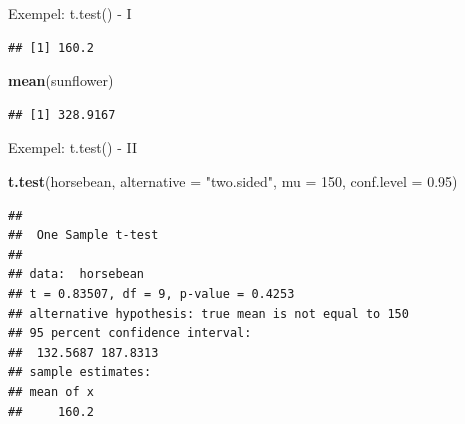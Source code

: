 \documentclass[
  11pt,
  ignorenonframetext,
  handout]{beamer}
\newenvironment{Shaded}{\begin{snugshade}}{\end{snugshade}}
\newcommand{\AttributeTok}[1]{\textcolor[rgb]{0.13,0.29,0.53}{#1}}
\newcommand{\DecValTok}[1]{\textcolor[rgb]{0.00,0.00,0.81}{#1}}
\newcommand{\FloatTok}[1]{\textcolor[rgb]{0.00,0.00,0.81}{#1}}
\newcommand{\FunctionTok}[1]{\textcolor[rgb]{0.13,0.29,0.53}{\textbf{#1}}}
\newcommand{\NormalTok}[1]{#1}
\newcommand{\OtherTok}[1]{\textcolor[rgb]{0.56,0.35,0.01}{#1}}
\newcommand{\SpecialCharTok}[1]{\textcolor[rgb]{0.81,0.36,0.00}{\textbf{#1}}}
\newcommand{\StringTok}[1]{\textcolor[rgb]{0.31,0.60,0.02}{#1}}
\begin{document}
\begin{frame}[fragile]{Exempel: t.test() - I}
\protect{}\label{exempel-t.test---i}
\begin{Shaded}
\end{Shaded}

\begin{verbatim}
## [1] 160.2
\end{verbatim}

\begin{Shaded}
\begin{Highlighting}[]
\FunctionTok{mean}\NormalTok{(sunflower)}
\end{Highlighting}
\end{Shaded}

\begin{verbatim}
## [1] 328.9167
\end{verbatim}
\end{frame}

\begin{frame}[fragile]{Exempel: t.test() - II}
\protect{}\label{exempel-t.test---ii}
\begin{Shaded}
\begin{Highlighting}[]
\FunctionTok{t.test}\NormalTok{(horsebean, }\AttributeTok{alternative =} \StringTok{"two.sided"}\NormalTok{,}
       \AttributeTok{mu =} \DecValTok{150}\NormalTok{, }\AttributeTok{conf.level =} \FloatTok{0.95}\NormalTok{)}
\end{Highlighting}
\end{Shaded}

\begin{verbatim}
## 
##  One Sample t-test
## 
## data:  horsebean
## t = 0.83507, df = 9, p-value = 0.4253
## alternative hypothesis: true mean is not equal to 150
## 95 percent confidence interval:
##  132.5687 187.8313
## sample estimates:
## mean of x 
##     160.2
\end{verbatim}
\end{frame}
\end{document}
